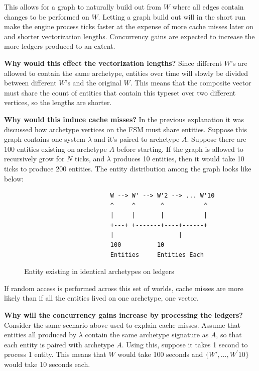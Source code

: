 This allows for a graph to naturally build out from $W$ where all edges contain changes to be performed on $W$. Letting a graph build out will in the short run make the engine process ticks faster at the expense of more cache misses later on and shorter vectorization lengths. Concurrency gains are expected to increase the more ledgers produced to an extent.

\textbf{Why would this effect the vectorization lengths?} Since different $W$'s are allowed to contain the same archetype, entities over time will slowly be divided between different $W$'s and the original $W$. This means that the composite vector must share the count of entities that contain this typeset over two different vertices, so the lengths are shorter. 

\textbf{Why would this induce cache misses?} In the previous explanation it was discussed how archetype vertices on the FSM must share entities. Suppose this graph contains one system $\lambda$ and it's paired to archetype $A$. Suppose there are 100 entities existing on archetype $A$ before starting. If the graph is allowed to recursively grow for $N$ ticks, and $\lambda$ produces 10 entities, then it would take 10 ticks to produce 200 entities. The entity distribution among the graph looks like below:


\begin{figure}[htbp]
    \centering
    \begin{verbatim}
                        W --> W' --> W'2 --> ... W'10
                        ^     ^       ^           ^  
                        |     |       |           |
                        +---+ +-------+----+------+  
                        |                  |         
                        100          10               
                        Entities     Entities Each    
    \end{verbatim}
    \caption{Entity existing in identical archetypes on ledgers}
\end{figure}

If random access is performed across this set of worlds, cache misses are more likely than if all the entities lived on one archetype, one vector.

\textbf{Why will the concurrency gains increase by processing the ledgers?} Consider the same scenario above used to explain cache misses. Assume that entities all produced by $\lambda$ contain the same archetype signature as $A$, so that each entity is paired with archetype $A$. Using this, suppose it takes 1 second to process 1 entity. This means that $W$ would take 100 seconds and $\{W',\ldots,W^\prime 10\}$ would take 10 seconds each. 


